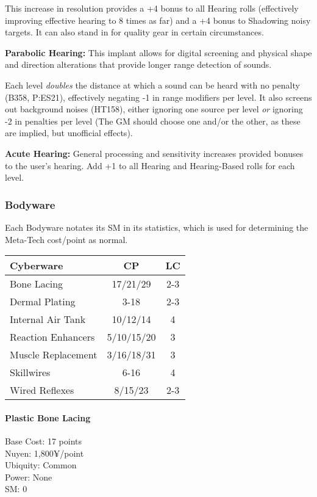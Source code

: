 \begin{multicols*}{3}
	This increase in resolution provides a +4 bonus to all Hearing rolls (effectively improving effective hearing to 8 times as far) and a +4 bonus to Shadowing noisy targets. It can also stand in for quality gear in certain circumstances.
	
	\textbf{Parabolic Hearing:} This implant allows for digital screening and physical shape and direction alterations that provide longer range detection of sounds.	
	
	Each level \textit{doubles} the distance at which a sound can be heard with no penalty (B358, P:ES21), effectively negating -1 in range modifiers per level. It also screens out background noises (HT158), either ignoring one source per level \textit{or} ignoring -2 in penalties per level (The GM should choose one and/or the other, as these are implied, but unofficial effects).
	
	\textbf{Acute Hearing:} General processing and sensitivity increases provided bonuses to the user's hearing. Add +1 to all Hearing and Hearing-Based rolls for each level.
	
	\subsubsection{Bodyware}
	
	Each Bodyware notates its SM in its statistics, which is used for determining the Meta-Tech cost/point as normal. 
	
	\begin{center}
		\begin{tabularx}{0.32\textwidth}{|X|c|c|}
			\hline
			Cyberware & CP & LC\\
			\hline
			\hline
			Bone Lacing & 17/21/29 & 2-3 \\
			Dermal Plating & 3-18 & 2-3 \\
			Internal Air Tank & 10/12/14 & 4 \\
			Reaction Enhancers & 5/10/15/20 & 3 \\
			Muscle Replacement & 3/16/18/31 & 3 \\
			Skillwires & 6-16 & 4 \\
			Wired Reflexes & 8/15/23 & 2-3 \\
			\hline
		\end{tabularx}
	\end{center}
		
	\paragraph{Plastic Bone Lacing}
	\begin{flushright}
		Base Cost: 17 points\\
		Nuyen: 1,800¥/point\\
		Ubiquity: Common\\
		Power: None\\
		SM: 0
	\end{flushright}
	

\end{multicols*}
